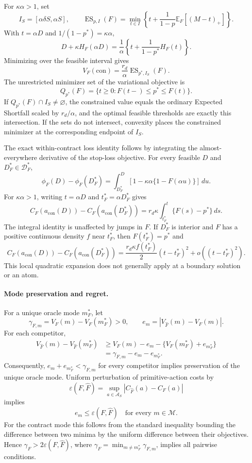 \documentclass[]{interact}
\begin{document}
For $\kappa\alpha>1$, set
\[
I_S=[\alpha\delta S,\alpha S],
\qquad
\operatorname{ES}_{p,I}(F)
=
\min_{t\in I}
\left\{
t+\frac{1}{1-p}\mathbb E_F[(M-t)_+]
\right\}.
\]
With $t=\alpha D$ and $1/(1-p^\ast)=\kappa\alpha$,
\[
D+\kappa H_F(\alpha D)
=
\frac{1}{\alpha}
\left\{
t+\frac{1}{1-p^\ast}H_F(t)
\right\}.
\]
Minimizing over the feasible interval gives
\[
V_F(\mathrm{con})
=
\frac{r_d}{\alpha}\operatorname{ES}_{p^\ast,I_S}(F).
\]
The unrestricted minimizer set of the variational objective is
\[
Q_{p^\ast}(F)
=
\{t\geq0:F(t-)\leq p^\ast\leq F(t)\}.
\]
If $Q_{p^\ast}(F)\cap I_S\neq\varnothing$, the constrained value
equals the ordinary Expected Shortfall scaled by $r_d/\alpha$, and the
optimal feasible thresholds are exactly this intersection. If the
sets do not intersect, convexity places the constrained minimizer at
the corresponding endpoint of $I_S$.

The exact within-contract loss identity follows by integrating the
almost-everywhere derivative of the stop-loss objective. For every
feasible $D$ and $D_F^\ast\in\mathcal D_F^\ast$,
\[
\phi_F(D)-\phi_F(D_F^\ast)
=
\int_{D_F^\ast}^{D}
\left[1-\kappa\alpha\{1-F(\alpha u)\}\right]\,du.
\]
For $\kappa\alpha>1$, writing $t=\alpha D$ and
$t_F^\ast=\alpha D_F^\ast$ gives
\[
C_F(a_{\mathrm{con}}(D))
-
C_F(a_{\mathrm{con}}(D_F^\ast))
=
r_d\kappa\int_{t_F^\ast}^{t}\{F(s)-p^\ast\}\,ds.
\]
The integral identity is unaffected by jumps in $F$. If $D_F^\ast$ is
interior and $F$ has a positive continuous density $f$ near
$t_F^\ast$, then $F(t_F^\ast)=p^\ast$ and
\[
C_F(a_{\mathrm{con}}(D))-C_F(a_{\mathrm{con}}(D_F^\ast))
=
\frac{r_d\kappa f(t_F^\ast)}{2}
(t-t_F^\ast)^2
+o\!\left((t-t_F^\ast)^2\right).
\]
This local quadratic expansion does not generally apply at a boundary
solution or an atom.

\paragraph*{Mode preservation and regret.}
For a unique oracle mode $m_F^\ast$, let
\[
\gamma_{F,m}=V_F(m)-V_F(m_F^\ast)>0,
\qquad
e_m=|V_{\widehat F}(m)-V_F(m)|.
\]
For each competitor,
\[
\begin{aligned}
V_{\widehat F}(m)-V_{\widehat F}(m_F^\ast)
&\geq V_F(m)-e_m-
\{V_F(m_F^\ast)+e_{m_F^\ast}\}\\
&=\gamma_{F,m}-e_m-e_{m_F^\ast}.
\end{aligned}
\]
Consequently, $e_m+e_{m_F^\ast}<\gamma_{F,m}$ for every competitor
implies preservation of the unique oracle mode. Uniform perturbation
of primitive-action costs by
\[
\varepsilon(F,\widehat F)
=
\sup_{a\in\mathcal A_S}
|C_{\widehat F}(a)-C_F(a)|
\]
implies
\[
e_m\leq\varepsilon(F,\widehat F)
\quad\text{for every }m\in\mathcal M.
\]
For the contract mode this follows from the standard inequality
bounding the difference between two minima by the uniform difference
between their objectives. Hence
$\gamma_F>2\varepsilon(F,\widehat F)$, where
$\gamma_F=\min_{m\neq m_F^\ast}\gamma_{F,m}$, implies all pairwise
conditions.
\end{document}
